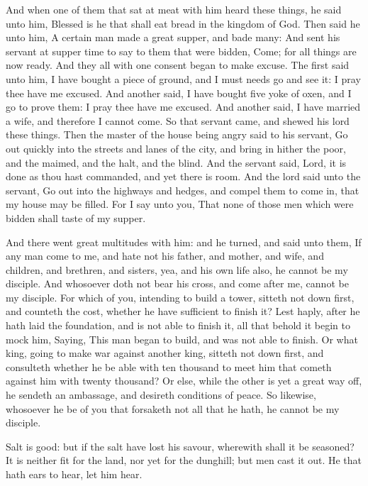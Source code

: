  And when one of them that sat at meat with him heard
these things, he said unto him, Blessed is he that shall eat bread in
the kingdom of God.  Then said he unto him, A certain man
made a great supper, and bade many:  And sent his servant
at supper time to say to them that were bidden, Come; for all things are
now ready.  And they all with one consent began to make
excuse. The first said unto him, I have bought a piece of ground, and I
must needs go and see it: I pray thee have me excused.  And
another said, I have bought five yoke of oxen, and I go to prove them: I
pray thee have me excused.  And another said, I have
married a wife, and therefore I cannot come.  So that
servant came, and shewed his lord these things. Then the master of the
house being angry said to his servant, Go out quickly into the streets
and lanes of the city, and bring in hither the poor, and the maimed, and
the halt, and the blind.  And the servant said, Lord, it is
done as thou hast commanded, and yet there is room.  And
the lord said unto the servant, Go out into the highways and hedges, and
compel them to come in, that my house may be filled.  For I
say unto you, That none of those men which were bidden shall taste of my
supper.

 And there went great multitudes with him: and he turned,
and said unto them,  If any man come to me, and hate not
his father, and mother, and wife, and children, and brethren, and
sisters, yea, and his own life also, he cannot be my disciple.
 And whosoever doth not bear his cross, and come after me,
cannot be my disciple.  For which of you, intending to
build a tower, sitteth not down first, and counteth the cost, whether he
have sufficient to finish it?  Lest haply, after he hath
laid the foundation, and is not able to finish it, all that behold it
begin to mock him,  Saying, This man began to build, and
was not able to finish.  Or what king, going to make war
against another king, sitteth not down first, and consulteth whether he
be able with ten thousand to meet him that cometh against him with
twenty thousand?  Or else, while the other is yet a great
way off, he sendeth an ambassage, and desireth conditions of peace.
 So likewise, whosoever he be of you that forsaketh not all
that he hath, he cannot be my disciple.

 Salt is good: but if the salt have lost his savour,
wherewith shall it be seasoned?  It is neither fit for the
land, nor yet for the dunghill; but men cast it out. He that hath ears
to hear, let him hear.

